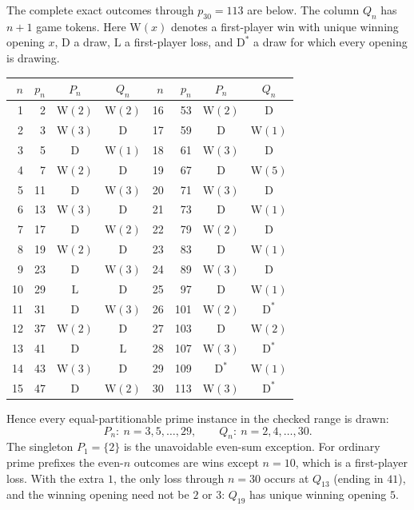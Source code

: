 \documentclass[11pt,a4paper]{article}
\begin{document}
The complete exact outcomes through $p_{30}=113$ are below.  The column $Q_n$ has $n+1$ game tokens. Here $\mathrm{W}(x)$ denotes a first-player win with unique winning opening $x$, $\mathrm{D}$ a draw, $\mathrm{L}$ a first-player loss, and $\mathrm{D}^*$ a draw for which every opening is drawing.

\begin{center}
\scriptsize
\setlength{\tabcolsep}{3.2pt}
\begin{tabular}{@{}r r c c@{\qquad}r r c c@{}}
\toprule
$n$ & $p_n$ & $P_n$ & $Q_n$ & $n$ & $p_n$ & $P_n$ & $Q_n$\\
\midrule
 1&  2&$\mathrm{W}(2)$&$\mathrm{W}(2)$ &16& 53&$\mathrm{W}(2)$&$\mathrm{D}$\\
 2&  3&$\mathrm{W}(3)$&$\mathrm{D}$    &17& 59&$\mathrm{D}$&$\mathrm{W}(1)$\\
 3&  5&$\mathrm{D}$&$\mathrm{W}(1)$    &18& 61&$\mathrm{W}(3)$&$\mathrm{D}$\\
 4&  7&$\mathrm{W}(2)$&$\mathrm{D}$    &19& 67&$\mathrm{D}$&$\mathrm{W}(5)$\\
 5& 11&$\mathrm{D}$&$\mathrm{W}(3)$    &20& 71&$\mathrm{W}(3)$&$\mathrm{D}$\\
 6& 13&$\mathrm{W}(3)$&$\mathrm{D}$    &21& 73&$\mathrm{D}$&$\mathrm{W}(1)$\\
 7& 17&$\mathrm{D}$&$\mathrm{W}(2)$    &22& 79&$\mathrm{W}(2)$&$\mathrm{D}$\\
 8& 19&$\mathrm{W}(2)$&$\mathrm{D}$    &23& 83&$\mathrm{D}$&$\mathrm{W}(1)$\\
 9& 23&$\mathrm{D}$&$\mathrm{W}(3)$    &24& 89&$\mathrm{W}(3)$&$\mathrm{D}$\\
10& 29&$\mathrm{L}$&$\mathrm{D}$      &25& 97&$\mathrm{D}$&$\mathrm{W}(1)$\\
11& 31&$\mathrm{D}$&$\mathrm{W}(3)$    &26&101&$\mathrm{W}(2)$&$\mathrm{D}^*$\\
12& 37&$\mathrm{W}(2)$&$\mathrm{D}$    &27&103&$\mathrm{D}$&$\mathrm{W}(2)$\\
13& 41&$\mathrm{D}$&$\mathrm{L}$      &28&107&$\mathrm{W}(3)$&$\mathrm{D}^*$\\
14& 43&$\mathrm{W}(3)$&$\mathrm{D}$    &29&109&$\mathrm{D}^*$&$\mathrm{W}(1)$\\
15& 47&$\mathrm{D}$&$\mathrm{W}(2)$    &30&113&$\mathrm{W}(3)$&$\mathrm{D}^*$\\
\bottomrule
\end{tabular}
\end{center}

Hence every equal-partitionable prime instance in the checked range is drawn:
\[
P_n:\ n=3,5,\ldots,29,\qquad
Q_n:\ n=2,4,\ldots,30.
\]
The singleton $P_1=\{2\}$ is the unavoidable even-sum exception.  For ordinary prime prefixes the even-$n$ outcomes are wins except $n=10$, which is a first-player loss.  With the extra $1$, the only loss through $n=30$ occurs at $Q_{13}$ (ending in $41$), and the winning opening need not be $2$ or $3$: $Q_{19}$ has unique winning opening $5$.
\end{document}
